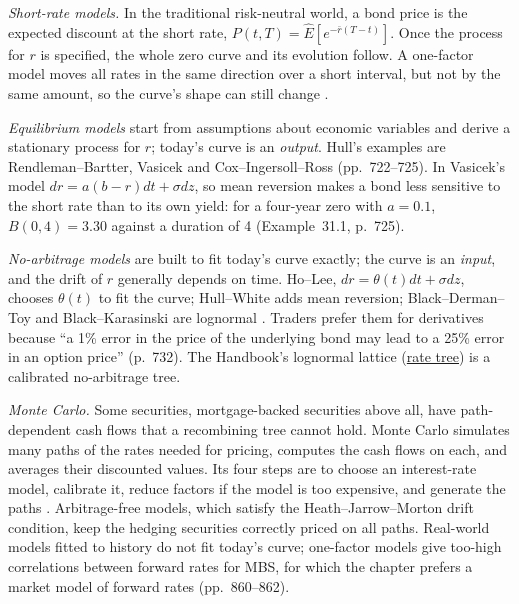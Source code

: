 \begin{qfmodel}\label{mod:term-structure-models-simulation}
 \emph{Short-rate models.} In the traditional risk-neutral world, a bond price is the expected discount at the short rate, $P(t,T)=\hat E[e^{-\bar r(T-t)}]$. Once the process for $r$ is specified, the whole zero curve and its evolution follow. A one-factor model moves all rates in the same direction over a short interval, but not by the same amount, so the curve's shape can still change \citep[chap.~31, secs.~31.1--31.2, pp.~719--722]{s7-hulloptions}.

\emph{Equilibrium models} start from assumptions about economic variables and derive a stationary process for $r$; today's curve is an \emph{output}. Hull's examples are Rendleman--Bartter, Vasicek and Cox--Ingersoll--Ross (pp.~722--725). In Vasicek's model $dr=a(b-r)dt+\sigma dz$, so mean reversion makes a bond less sensitive to the short rate than to its own yield: for a four-year zero with $a=0.1$, $B(0,4)=3.30$ against a duration of 4 (Example~31.1, p.~725).

\emph{No-arbitrage models} are built to fit today's curve exactly; the curve is an \emph{input}, and the drift of $r$ generally depends on time. Ho--Lee, $dr=\theta(t)dt+\sigma dz$, chooses $\theta(t)$ to fit the curve; Hull--White adds mean reversion; Black--Derman--Toy and Black--Karasinski are lognormal \citep[chap.~32, sec.~32.1, pp.~732--736]{s7-hulloptions}. Traders prefer them for derivatives because ``a 1\% error in the price of the underlying bond may lead to a 25\% error in an option price'' (p.~732). The Handbook's lognormal lattice (\hyperref[meth:binomial-rate-tree-calibration]{rate tree}) is a calibrated no-arbitrage tree.

\emph{Monte Carlo.} Some securities, mortgage-backed securities above all, have path-dependent cash flows that a recombining tree cannot hold. Monte Carlo simulates many paths of the rates needed for pricing, computes the cash flows on each, and averages their discounted values. Its four steps are to choose an interest-rate model, calibrate it, reduce factors if the model is too expensive, and generate the paths \citep[chap.~37, pp.~859--860]{s7-fabozzifixed}. Arbitrage-free models, which satisfy the Heath--Jarrow--Morton drift condition, keep the hedging securities correctly priced on all paths. Real-world models fitted to history do not fit today's curve; one-factor models give too-high correlations between forward rates for MBS, for which the chapter prefers a market model of forward rates (pp.~860--862).


\end{qfmodel}
